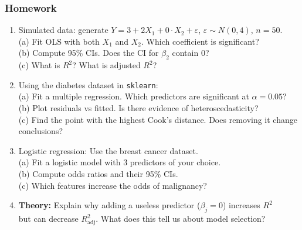\documentclass[aspectratio=169]{beamer}
\begin{document}
\begin{frame}
\frametitle{Homework}
\begin{enumerate}\setlength{\itemsep}{6pt}
  \item Simulated data: generate $Y = 3 + 2X_1 + 0 \cdot X_2 + \varepsilon$, $\varepsilon \sim N(0, 4)$, $n = 50$.\\
    (a) Fit OLS with both $X_1$ and $X_2$. Which coefficient is significant?\\
    (b) Compute 95\% CIs. Does the CI for $\beta_2$ contain 0?\\
    (c) What is $R^2$? What is adjusted $R^2$?

  \item Using the diabetes dataset in \texttt{sklearn}:\\
    (a) Fit a multiple regression. Which predictors are significant at $\alpha = 0.05$?\\
    (b) Plot residuals vs fitted. Is there evidence of heteroscedasticity?\\
    (c) Find the point with the highest Cook's distance. Does removing it change conclusions?

  \item Logistic regression: Use the breast cancer dataset.\\
    (a) Fit a logistic model with 3 predictors of your choice.\\
    (b) Compute odds ratios and their 95\% CIs.\\
    (c) Which features increase the odds of malignancy?

  \item \textbf{Theory:} Explain why adding a useless predictor ($\beta_j = 0$) increases $R^2$\\
    but can decrease $R^2_{\text{adj}}$. What does this tell us about model selection?
\end{enumerate}
\end{frame}
\end{document}
